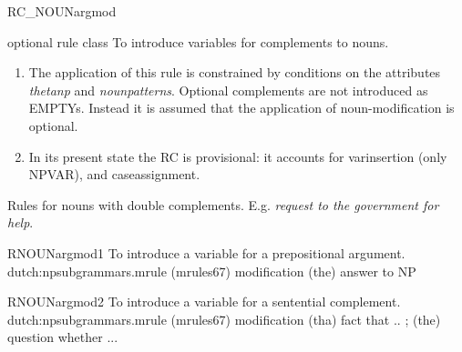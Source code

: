 \begin{mruleclass}{RC\_NOUNargmod}
\begin{classdescr}
\kind optional rule class
\classtask To introduce variables for complements to nouns.
\classremarks\mbox{}\\
\begin{enumerate}
  \item 
The application of this rule is constrained by  conditions on the attributes 
{\em 
thetanp} and {\em nounpatterns}. Optional complements are not introduced as 
EMPTYs. Instead it is assumed that the application of 
noun-modification is optional.
  \item
In its present state the RC is provisional: it accounts for 
 varinsertion (only NPVAR), and   caseassignment.
\end{enumerate}
\nofilters

\nospeedrules

\begin{plannedrules}
\item
Rules for nouns with double complements. E.g. {\em request to the government 
for help}.
\end{plannedrules}
\norulesnotince


\end{classdescr}

\begin{members}
   
\begin{member}
 RNOUNargmod1
 To introduce a variable for a prepositional argument.
\file dutch:npsubgrammars.mrule (mrules67)
\semantics modification
\example (the) answer to NP
\remarks\mbox{}

\end{member}
   
\begin{member}
 RNOUNargmod2
 To introduce a variable for a sentential complement.
\file dutch:npsubgrammars.mrule (mrules67)
\semantics modification
\example  (tha) fact that .. ; (the) question whether ...
\remarks\mbox{}

\end{member}
\end{members}
\end{mruleclass}

